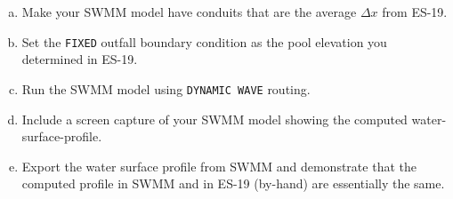 \documentclass[12pt]{article}
\begin{document}
\begin{enumerate}
%
\begin{enumerate}[a)]
\item Make your SWMM model have conduits that are the average $\Delta x$ from ES-19.
\item Set the \texttt{FIXED} outfall boundary condition as the pool elevation you determined in ES-19.
\item Run the SWMM model using \texttt{DYNAMIC WAVE} routing.
\item Include a screen capture of your SWMM model showing the computed water-surface-profile.   
\item Export the water surface profile from SWMM and demonstrate that the computed profile in SWMM and in ES-19 (by-hand) are essentially the same.
\end{enumerate}


\end{enumerate}
\end{document}

